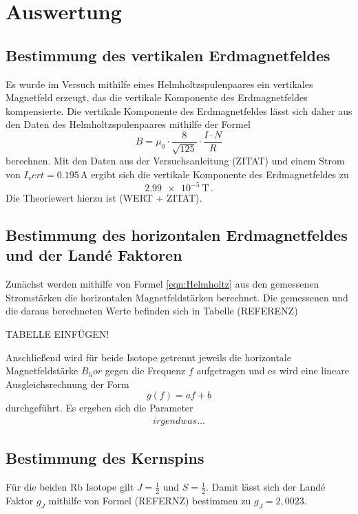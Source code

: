 \section{Auswertung}
\label{sec:Auswertung}

\subsection{Bestimmung des vertikalen Erdmagnetfeldes}
\label{subsec:vertikal}

Es wurde im Versuch mithilfe eines Helmholtzspulenpaares ein vertikales Magnetfeld
erzeugt, das die vertikale Komponente des Erdmagnetfeldes kompensierte. Die vertikale
Komponente des Erdmagnetfeldes lässt sich daher aus den Daten des Helmholtzspulenpaares
mithilfe der Formel
\begin{equation}
    B= \mu_0 \cdot  \frac{8}{\sqrt {125}}\cdot \frac{I\cdot N}{R}
    \label{eqn:Helmholtz}
\end{equation}
berechnen. Mit den Daten aus der Versuchsanleitung (ZITAT) und einem Strom von
$I_vert=0.195\,$A ergibt sich die vertikale Komponente des Erdmagnetfeldes zu
\begin{equation*}
  \SI{2.99e-5}{\tesla}\,.
\end{equation*}
Die Theoriewert hierzu ist (WERT + ZITAT).

\subsection{Bestimmung des horizontalen Erdmagnetfeldes und der Landé Faktoren}
\label{subsec:horizontal}

Zunächst werden mithilfe von Formel \eqref{eqn:Helmholtz} aus den gemessenen Stromstärken
die horizontalen Magnetfeldstärken berechnet. Die gemessenen und die daraus berechneten Werte befinden sich
in Tabelle (REFERENZ)

TABELLE EINFÜGEN!

Anschließend wird für beide Isotope getrennt jeweils die horizontale Magnetfeldstärke $B_hor$
gegen die Frequenz $f$ aufgetragen und es wird eine lineare Ausgleichsrechnung der Form
\begin{equation*}
  g(f)=af+b
\end{equation*}
durchgeführt. Es ergeben sich die Parameter
\begin{align*}
 irgendwas...
\end{align*}


\subsection{Bestimmung des Kernspins}
\label{subsec:Kernspin}

Für die beiden Rb Isotope gilt $J=\frac{1}{2}$ und $S=\frac{1}{2}$. Damit lässt sich
der Landé Faktor $g_J$ mithilfe von Formel (REFERNZ) bestimmen zu $g_J=2{,}0023$.
